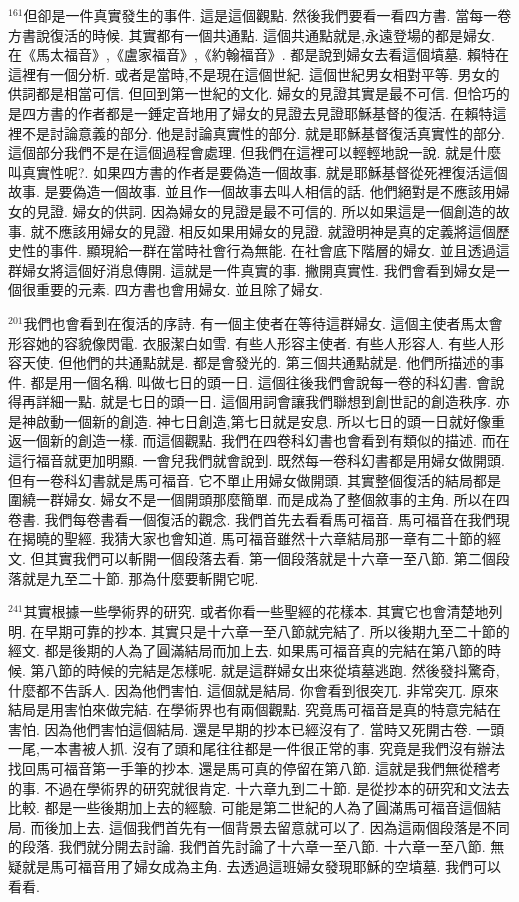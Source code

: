 \documentclass{book}
\begin{document}
$^{161}$但卻是一件真實發生的事件.
這是這個觀點.
然後我們要看一看四方書.
當每一卷方書說復活的時候.
其實都有一個共通點.
這個共通點就是,永遠登場的都是婦女.
在《馬太福音》,《盧家福音》,《約翰福音》.
都是說到婦女去看這個墳墓.
賴特在這裡有一個分析.
或者是當時,不是現在這個世紀.
這個世紀男女相對平等.
男女的供詞都是相當可信.
但回到第一世紀的文化.
婦女的見證其實是最不可信.
但恰巧的是四方書的作者都是一錘定音地用了婦女的見證去見證耶穌基督的復活.
在賴特這裡不是討論意義的部分.
他是討論真實性的部分.
就是耶穌基督復活真實性的部分.
這個部分我們不是在這個過程會處理.
但我們在這裡可以輕輕地說一說.
就是什麼叫真實性呢?.
如果四方書的作者是要偽造一個故事.
就是耶穌基督從死裡復活這個故事.
是要偽造一個故事.
並且作一個故事去叫人相信的話.
他們絕對是不應該用婦女的見證.
婦女的供詞.
因為婦女的見證是最不可信的.
所以如果這是一個創造的故事.
就不應該用婦女的見證.
相反如果用婦女的見證.
就證明神是真的定義將這個歷史性的事件.
顯現給一群在當時社會行為無能.
在社會底下階層的婦女.
並且透過這群婦女將這個好消息傳開.
這就是一件真實的事.
撇開真實性.
我們會看到婦女是一個很重要的元素.
四方書也會用婦女.
並且除了婦女.

$^{201}$我們也會看到在復活的序詩.
有一個主使者在等待這群婦女.
這個主使者馬太會形容她的容貌像閃電.
衣服潔白如雪.
有些人形容主使者.
有些人形容人.
有些人形容天使.
但他們的共通點就是.
都是會發光的.
第三個共通點就是.
他們所描述的事件.
都是用一個名稱.
叫做七日的頭一日.
這個往後我們會說每一卷的科幻書.
會說得再詳細一點.
就是七日的頭一日.
這個用詞會讓我們聯想到創世記的創造秩序.
亦是神啟動一個新的創造.
神七日創造,第七日就是安息.
所以七日的頭一日就好像重返一個新的創造一樣.
而這個觀點.
我們在四卷科幻書也會看到有類似的描述.
而在這行福音就更加明顯.
一會兒我們就會說到.
既然每一卷科幻書都是用婦女做開頭.
但有一卷科幻書就是馬可福音.
它不單止用婦女做開頭.
其實整個復活的結局都是圍繞一群婦女.
婦女不是一個開頭那麼簡單.
而是成為了整個敘事的主角.
所以在四卷書.
我們每卷書看一個復活的觀念.
我們首先去看看馬可福音.
馬可福音在我們現在揭曉的聖經.
我猜大家也會知道.
馬可福音雖然十六章結局那一章有二十節的經文.
但其實我們可以斬開一個段落去看.
第一個段落就是十六章一至八節.
第二個段落就是九至二十節.
那為什麼要斬開它呢.

$^{241}$其實根據一些學術界的研究.
或者你看一些聖經的花樣本.
其實它也會清楚地列明.
在早期可靠的抄本.
其實只是十六章一至八節就完結了.
所以後期九至二十節的經文.
都是後期的人為了圓滿結局而加上去.
如果馬可福音真的完結在第八節的時候.
第八節的時候的完結是怎樣呢.
就是這群婦女出來從墳墓逃跑.
然後發抖驚奇,什麼都不告訴人.
因為他們害怕.
這個就是結局.
你會看到很突兀.
非常突兀.
原來結局是用害怕來做完結.
在學術界也有兩個觀點.
究竟馬可福音是真的特意完結在害怕.
因為他們害怕這個結局.
還是早期的抄本已經沒有了.
當時又死開古卷.
一頭一尾,一本書被人抓.
沒有了頭和尾往往都是一件很正常的事.
究竟是我們沒有辦法找回馬可福音第一手筆的抄本.
還是馬可真的停留在第八節.
這就是我們無從稽考的事.
不過在學術界的研究就很肯定.
十六章九到二十節.
是從抄本的研究和文法去比較.
都是一些後期加上去的經驗.
可能是第二世紀的人為了圓滿馬可福音這個結局.
而後加上去.
這個我們首先有一個背景去留意就可以了.
因為這兩個段落是不同的段落.
我們就分開去討論.
我們首先討論了十六章一至八節.
十六章一至八節.
無疑就是馬可福音用了婦女成為主角.
去透過這班婦女發現耶穌的空墳墓.
我們可以看看.
\end{document}
